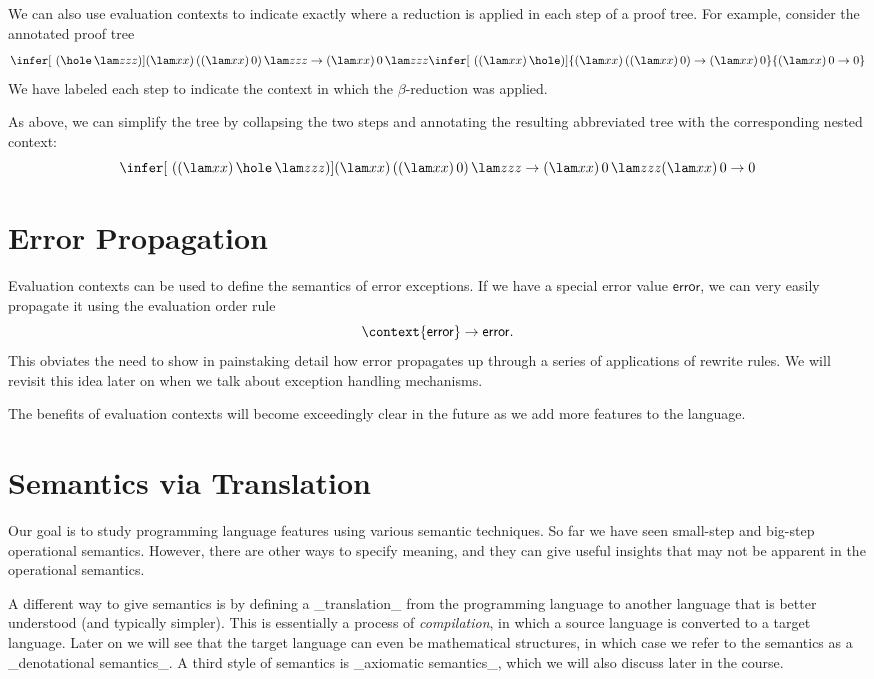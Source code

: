 We can also use evaluation contexts to indicate exactly where a reduction is applied in each step of a proof tree. For example, consider the annotated proof tree
\[
 \infer[\ (\hole\,\lam z{zz})]{(\lam xx)\,((\lam xx)\,0)\,\lam z{zz}\rightarrow(\lam xx)\,0\,\lam z{zz}}
 {\infer[\ ((\lam xx)\,\hole)]{(\lam xx)\,((\lam xx)\,0)\rightarrow(\lam xx)\,0}{(\lam xx)\,0 \rightarrow 0}}
\]
We have labeled each step to indicate the context in which the $\beta$-reduction was applied.

As above, we can simplify the tree by collapsing the two steps and annotating the resulting abbreviated tree with the corresponding nested context:
\[
 \infer[\ ((\lam xx)\,\hole\,\lam z{zz})]{(\lam xx)\,((\lam xx)\,0)\,\lam z{zz}\rightarrow(\lam xx)\,0\,\lam z{zz}}
 {(\lam xx)\,0 \rightarrow 0}
\]

\section{Error Propagation}

Evaluation contexts can be used to define the semantics of error exceptions. If we have a special error value $\mathsf{error}$, we can very easily propagate it using the evaluation order rule
\[
 \context{\mathsf{error}} \rightarrow \mathsf{error}.
\]
This obviates the need to show in painstaking detail how error propagates up through a series of applications of rewrite rules. We will revisit this idea later on when we talk about exception handling mechanisms.

The benefits of evaluation contexts will become exceedingly clear in the future as we add more features to the language.

\section{Semantics via Translation}

Our goal is to study programming language features using various
semantic techniques. So far we have seen small-step and big-step
operational semantics. However, there are other ways to specify
meaning, and they can give useful insights that may not be apparent in
the operational semantics.

A different way to give semantics is by defining a _translation_ from
the programming language to another language that is better understood
(and typically simpler). This is essentially a process
of \emph{compilation}, in which a source language is converted to a
target language.  Later on we will see that the target language can
even be mathematical structures, in which case we refer to the
semantics as a _denotational semantics_. A third style of semantics is
_axiomatic semantics_, which we will also discuss later in the course.


